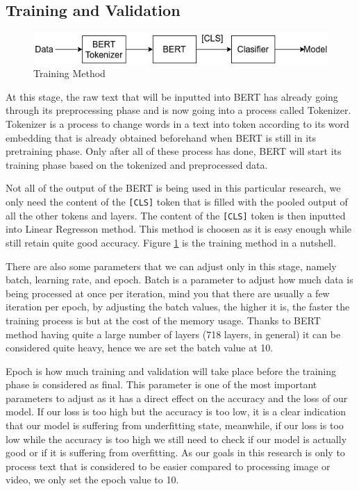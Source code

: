 \subsection{Training and Validation}

\begin{figure}[h!]
    \begin{center}
        \includegraphics[width= 0.9\linewidth]{gambar/training.png}
        \caption{Training Method}
        \label{fig: metodologi_training}
    \end{center}
\end{figure}

At this stage, the raw text that will be inputted into BERT has already going through its preprocessing phase and is now going into a process called Tokenizer. Tokenizer is a process to change words in a text into token according to its word embedding that is already obtained beforehand when BERT is still in its pretraining phase. Only after all of these process has done, BERT will start its training phase based on the tokenized and preprocessed data.

Not all of the output of the BERT is being used in this particular research, we only need the content of the \texttt{[CLS]} token that is filled with the pooled output of all the other tokens and layers. The content of the \texttt{[CLS]} token is then inputted into Linear Regresson method. This method is choosen as it is easy enough while still retain quite good accuracy. Figure \ref{fig: metodologi_training} is the training method in a nutshell.

There are also some parameters that we can adjust only in this stage, namely batch, learning rate, and epoch. Batch is a parameter to adjust how much data is being processed at once per iteration, mind you that there are usually a few iteration per epoch, by adjusting the batch values, the higher it is, the faster the training process is but at the cost of the memory usage. Thanks to BERT method having quite a large number of layers (718 layers, in general) it can be considered quite heavy, hence we are set the batch value at 10.

Epoch is how much training and validation will take place before the training phase is considered as final. This parameter is one of the most important parameters to adjust as it has a direct effect on the accuracy and the loss of our model. If our loss is too high but the accuracy is too low, it is a clear indication that our model is suffering from underfitting state, meanwhile, if our loss is too low while the accuracy is too high we still need to check if our model is actually good or if it is suffering from overfitting. As our goals in this research is only to process text that is considered to be easier compared to processing image or video, we only set the epoch value to 10.

